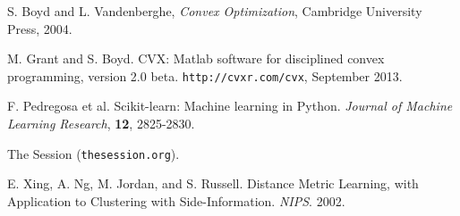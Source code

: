\documentclass{article} %
\begin{document}
\begin{thebibliography}{9}

S. Boyd and L. Vandenberghe, \textit{Convex Optimization}, Cambridge University
Press, 2004.

M. Grant and S. Boyd. CVX: Matlab software for disciplined convex
programming, version 2.0 beta. \texttt{http://cvxr.com/cvx}, September 2013.

F. Pedregosa et al. Scikit-learn: Machine learning in Python. 
\textit{Journal of Machine Learning Research}, \textbf{12}, 2825-2830.

The Session (\texttt{thesession.org}).

E. Xing, A. Ng, M. Jordan, and S. Russell. Distance Metric Learning, with
Application to Clustering with Side-Information. \textit{NIPS}. 2002.

\end{thebibliography}
\end{document}
